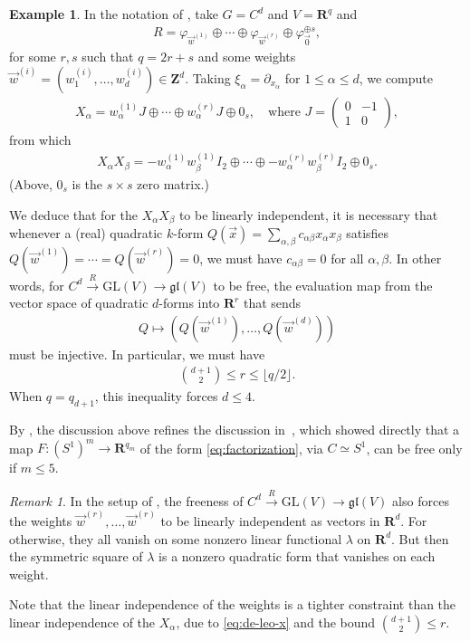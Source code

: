 \documentclass[a4paper,10pt,leqno]{article}
\numberwithin{equation}{section}
\theoremstyle{plain}
\theoremstyle{definition}
\newtheorem{ex}[thm]{Example}
\theoremstyle{remark}
\newtheorem{rem}[thm]{Remark}
\newcommand{\bb}{\mathbf}
\newcommand{\fr}{\mathfrak}
\newcommand{\GL}{\mathrm{GL}}
\newcommand{\mat}[1]{\begin{matrix}#1\end{matrix}}
\newcommand{\pmat}[1]{\left(\mat{#1}\right)}
\begin{document}
\begin{ex}\label{ex:quadratic}
In the notation of , take $G = C^d$ and $V = \bb{R}^q$ and 
\begin{align} 
R = \varphi_{\vec{w}^{(1)}} \oplus \cdots \oplus \varphi_{\vec{w}^{(r)}} \oplus \varphi_{\vec{0}}^{\oplus s},
\end{align} 
for some $r, s$ such that $q = 2r + s$ and some weights $\vec{w}^{(i)} = (w_1^{(i)}, \ldots, w_d^{(i)}) \in \bb{Z}^d$.
Taking $\xi_\alpha = \partial_{x_\alpha}$ for $1 \leq \alpha \leq d$, we compute
\begin{align}\label{eq:de-leo-x}
X_\alpha = w^{(1)}_\alpha J \oplus \cdots \oplus w^{(r)}_\alpha J \oplus 0_s,
	\quad\text{where $J = \pmat{0 & -1 \\ 1 & 0}$},
\end{align}
from which
\begin{align}
X_\alpha X_\beta = -w_\alpha^{(1)}w_\beta^{(1)} I_2 \oplus \cdots \oplus -w_\alpha^{(r)}w_\beta^{(r)} I_2 \oplus 0_s.
\end{align} 
(Above, $0_s$ is the $s \times s$ zero matrix.)

We deduce that for the $X_\alpha X_\beta$ to be linearly independent, it is necessary that whenever a (real) quadratic $k$-form $Q(\vec{x}) = \sum_{\alpha, \beta} c_{\alpha\beta} x_\alpha x_\beta$ satisfies $Q(\vec{w}^{(1)}) = \cdots = Q(\vec{w}^{(r)}) = 0$, we must have $c_{\alpha\beta}= 0$ for all $\alpha, \beta$.
In other words, for $C^d \xrightarrow{R} \GL(V) \to \fr{gl}(V)$ to be free, the evaluation map from the vector space of quadratic $d$-forms into $\bb{R}^r$ that sends
\begin{align}\label{eq:quadratic}
	Q \mapsto (Q(\vec{w}^{(1)}), \ldots, Q(\vec{w}^{(d)}))
\end{align}
must be injective.
In particular, we must have 
\begin{align} 
\binom{d + 1}{2} \leq r \leq \lfloor q/2\rfloor.
\end{align}
When $q = q_{d + 1}$, this inequality forces $d \leq 4$.

By , the discussion above refines the discussion in~\cite[\S{2.5}]{deleo}, which showed directly that a map $F \colon (S^1)^m \to \bb{R}^{q_m}$ of the form \eqref{eq:factorization}, via $C \simeq S^1$, can be free only if $m \leq 5$.
\end{ex}

\begin{rem} 
In the setup of , the freeness of $C^d \xrightarrow{R} \GL(V) \to \fr{gl}(V)$ also forces the weights $\vec{w}^{(r)}, \ldots, \vec{w}^{(r)}$ to be linearly independent as vectors in $\bb{R}^d$.
For otherwise, they all vanish on some nonzero linear functional $\lambda$ on $\bb{R}^d$.
But then the symmetric square of $\lambda$ is a nonzero quadratic form that vanishes on each weight.

Note that the linear independence of the weights is a tighter constraint than the linear independence of the $X_\alpha$, due to \eqref{eq:de-leo-x} and the bound $\binom{d + 1}{2} \leq r$.
\end{rem} 
\end{document}
